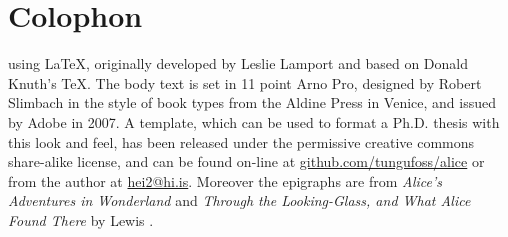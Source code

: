 \chapter*{Colophon}

\begin{center}
\parbox{200pt}{\raggedright {} using \LaTeX, originally developed by Leslie Lamport and based on Donald Knuth's \TeX. The body text is set in 11 point Arno Pro, designed by Robert Slimbach in the style of book types from the Aldine Press in Venice, and issued by Adobe in 2007. A template, which can be used to format a Ph.D. thesis with this look and feel, has been released under the permissive creative commons share-alike license, and can be found on-line at \href{https://github.com/tungufoss/alice/tree/master/Papers/Thesis}{github.com/tungufoss/alice} or from the author at \href{mailto:hei2@hi.is}{hei2@hi.is}. 
Moreover the epigraphs are from \emph{Alice's Adventures in Wonderland} \citeyearpar{alice} and \emph{Through the Looking-Glass, and What Alice Found There} \citeyearpar{lookingglass} by Lewis \citeauthor{alice}.}
\end{center}